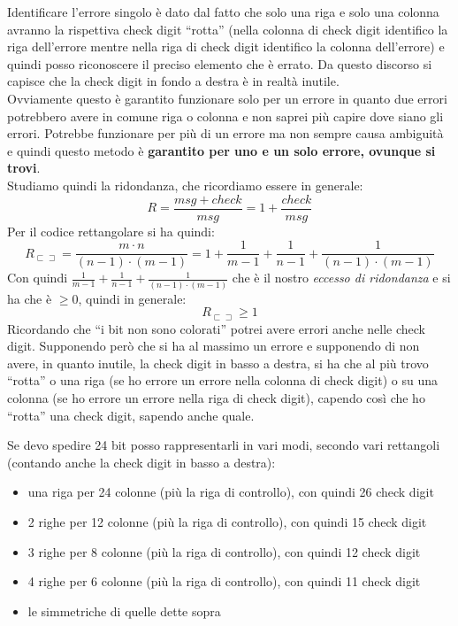 \documentclass[a4paper,12pt, oneside]{book}
\begin{document}
Identificare l'errore singolo è dato dal fatto che solo una riga e solo una
colonna avranno la rispettiva check digit ``rotta'' (nella colonna di check
digit identifico la riga dell'errore mentre nella riga di check digit identifico
la colonna dell'errore) e quindi posso riconoscere il preciso elemento che è
errato. Da questo discorso si capisce che la check digit in fondo a destra è in
realtà inutile.\\ 
Ovviamente questo è garantito funzionare solo per un errore in quanto due errori
potrebbero avere in comune riga o colonna e non saprei più capire dove siano gli
errori. Potrebbe funzionare per più di un errore ma non sempre causa ambiguità e
quindi questo metodo è \textbf{garantito per uno e un solo errore, ovunque si
  trovi}.\\ 
Studiamo quindi la ridondanza, che ricordiamo essere in generale:
\[R=\frac{msg+check}{msg}=1+\frac{check}{msg}\]
Per il codice rettangolare si ha quindi:
\[R_{\sqsubset \! \sqsupset}=\frac{m\cdot n}{(n-1)\cdot
    (m-1)}=1+\frac{1}{m-1}+\frac{1}{n-1}+\frac{1}{(n-1)\cdot (m-1)}\]
Con quindi $\frac{1}{m-1}+\frac{1}{n-1}+\frac{1}{(n-1)\cdot (m-1)}$ che è il
nostro \textit{eccesso di ridondanza} e si ha che è $\geq 0$, quindi in
generale:
\[R_{\sqsubset \! \sqsupset}\geq 1\]
Ricordando che ``i bit non sono colorati'' potrei avere errori anche nelle
check digit. Supponendo però che si ha al massimo un errore e supponendo di non
avere, in quanto inutile, la check digit in basso a destra,  si ha che al più
trovo ``rotta'' o una riga (se ho errore un errore nella colonna di check digit)
o su una colonna (se ho errore un errore nella riga di check digit), capendo
così che ho ``rotta'' una check digit, sapendo anche quale.
\begin{esempio}
  Se devo spedire 24 bit posso rappresentarli in vari modi, secondo vari
  rettangoli (contando anche la check digit in basso a destra):  
  \begin{itemize}
    \item una riga per 24 colonne (più la riga di controllo), con quindi 26
    check digit
    \item 2 righe per 12 colonne (più la riga di controllo), con quindi 15
    check digit
    \item 3 righe per 8 colonne (più la riga di controllo), con quindi 12
    check digit
    \item 4 righe per 6 colonne (più la riga di controllo), con quindi 11
    check digit
    \item le simmetriche di quelle dette sopra
  \end{itemize}
  
\end{esempio}
\end{document}
